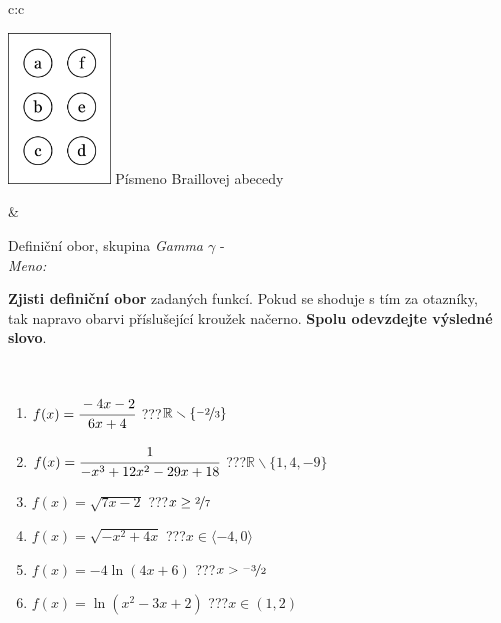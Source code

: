 \documentclass[10pt]{report}
\begin{document}
\begin{tabular}{c:c}
\begin{minipage}[c][104.5mm][t]{0.5\linewidth}
\begin{center}
\begin{minipage}{0.20\linewidth}
\begin{center}
\includegraphics[height=40mm]{../images/braille.png}
{\small Písmeno Braillovej abecedy}
\end{center}
\end{minipage}
\end{center}
\end{minipage}
&
\begin{minipage}[c][104.5mm][t]{0.5\linewidth}
\begin{center}
\vspace{7mm}
{\huge Definiční obor, skupina \textit{Gamma $\gamma$} -}\\[5mm]
\textit{Meno:}\phantom{xxxxxxxxxxxxxxxxxxxxxxxxxxxxxxxxxxxxxxxxxxxxxxxxxxxxxxxxxxxxxxxxx}\\[5mm]
\begin{minipage}{0.95\linewidth}
\textbf{Zjisti definiční obor} zadaných funkcí. Pokud se shoduje s tím za otazníky,\\tak napravo obarvi příslušející kroužek načerno. \textbf{Spolu odevzdejte výsledné slovo}.
\end{minipage}
\\[1mm]
\begin{minipage}{0.79\linewidth}
\begin{center}
\begin{varwidth}{\linewidth}
\begin{enumerate}
\normalsizerrr
\item $f(x)=\cfrac{-4x-2}{6x+4}$\quad \dotfill\; ???\;\dotfill \quad $\mathbb{R}\smallsetminus\{\nicefrac{-2}{3}\}$
\item $f(x)=\cfrac{1}{-x^3+12x^2-29x+18}$\quad \dotfill\; ???\;\dotfill \quad $\mathbb{R}\smallsetminus\{1,4,-9\}$
\item $f(x)=\sqrt{7x-2}$\quad \dotfill\; ???\;\dotfill \quad $x\geq\nicefrac{2}{7}$
\item $f(x)=\sqrt{-x^2+4x}$\quad \dotfill\; ???\;\dotfill \quad $x\in\langle-4 , 0\rangle$
\item $f(x)=-4\ln{(4x+6)}$\quad \dotfill\; ???\;\dotfill \quad $x>\nicefrac{-3}{2}$
\item $f(x)=\ln{(x^2-3x+2)}$\quad \dotfill\; ???\;\dotfill \quad $x\in(1 , 2)$

\end{enumerate}
\end{varwidth}
\end{center}
\end{minipage}
\end{center}
\end{minipage}
\end{tabular}
\end{document}
